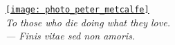 %
%

\pubmode
	\onecolumngrid
\fi

\vspace*{180pt}
\begin{center}
	\href{https://youtu.be/fuF-z-Aq37o}{\texttt{[image: photo\_peter\_metcalfe]}}\\
	\textit{To those who die doing what they love.\\ --- Finis vitae sed non amoris.}
\end{center}
\newpage

\pubmode
	\twocolumngrid
\fi

